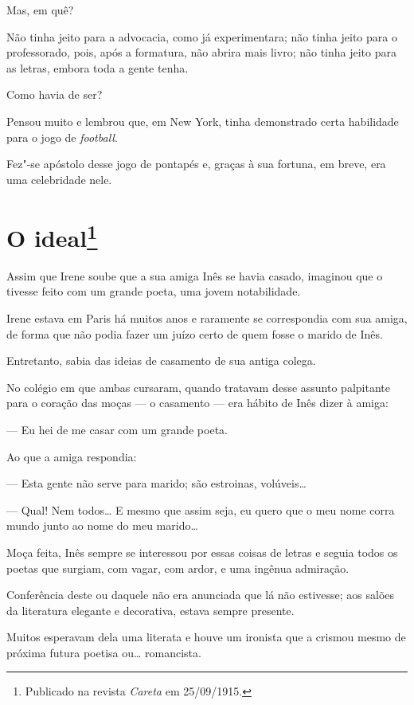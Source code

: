 Mas, em quê?

Não tinha jeito para a advocacia, como já experimentara; não tinha jeito
para o professorado, pois, após a formatura, não abrira mais livro; não
tinha jeito para as letras, embora toda a gente tenha.

Como havia de ser?

Pensou muito e lembrou que, em New York, tinha demonstrado certa
habilidade para o jogo de \emph{football}.

Fez"-se apóstolo desse jogo de pontapés e, graças à sua fortuna, em
breve, era uma celebridade nele.



\chapter[O ideal]{O ideal\footnote[*]{Publicado na revista \emph{Careta} em 25/09/1915.}}

Assim que Irene soube que a sua amiga Inês se havia casado, imaginou que
o tivesse feito com um grande poeta, uma jovem notabilidade.

Irene estava em Paris há muitos anos e raramente se correspondia com sua
amiga, de forma que não podia fazer um juízo certo de quem fosse o
marido de Inês.

Entretanto, sabia das ideias de casamento de sua antiga colega.

No colégio em que ambas cursaram, quando tratavam desse assunto
palpitante para o coração das moças --- o casamento --- era hábito de Inês
dizer à amiga:

--- Eu hei de me casar com um grande poeta.

Ao que a amiga respondia:

--- Esta gente não serve para marido; são estroinas, volúveis\ldots{}

--- Qual! Nem todos\ldots{} E mesmo que assim seja, eu quero que o meu nome
corra mundo junto ao nome do meu marido\ldots{}

Moça feita, Inês sempre se interessou por essas coisas de letras e
seguia todos os poetas que surgiam, com vagar, com ardor, e uma ingênua
admiração.

Conferência deste ou daquele não era anunciada que lá não estivesse; aos
salões da literatura elegante e decorativa, estava sempre presente.

Muitos esperavam dela uma literata e houve um ironista que a crismou
mesmo de próxima futura poetisa ou\ldots{} romancista.

